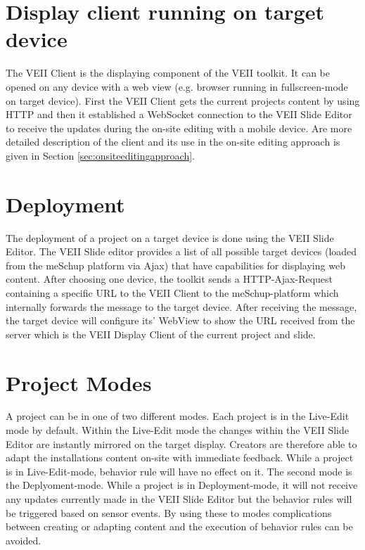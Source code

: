 \section{Display client running on target device}
The VEII Client is the displaying component of the VEII toolkit. It can be opened on any device with a web view (e.g. browser running in fullscreen-mode on target device). First the VEII Client gets the current projects content by using HTTP and then it established a WebSocket connection to the VEII Slide Editor to receive the updates during the on-site editing with a mobile device. Are more detailed description of the client and its use in the on-site editing approach is given in Section \ref{sec:onsiteeditingapproach}.

\section{Deployment}
The deployment of a project on a target device is done using the VEII Slide Editor. The VEII Slide editor provides a list of all possible target devices (loaded from the meSchup platform via Ajax) that have capabilities for displaying web content. After choosing one device, the toolkit sends a HTTP-Ajax-Request containing a specific URL to the VEII Client to the meSchup-platform which internally forwards the message to the target device. After receiving the message, the target device will configure its' WebView to show the URL received from the server which is the VEII Display Client of the current project and slide.

\section{Project Modes}
\label{sec:projectmodes}
A project can be in one of two different modes. Each project is in the Live-Edit mode by default. Within the Live-Edit mode the changes within the VEII Slide Editor are instantly mirrored on the target display. Creators are therefore able to adapt the installations content on-site with immediate feedback. While a project is in Live-Edit-mode, behavior rule will have no effect on it. The second mode is the Deplyoment-mode. While a project is in Deployment-mode, it will not receive any updates currently made in the VEII Slide Editor but the behavior rules will be triggered based on sensor events. By using these to modes complications between creating or adapting content and the execution of behavior rules can be avoided.

